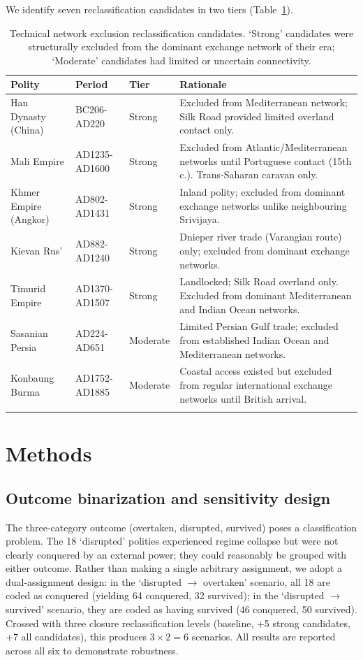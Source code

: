 \documentclass[pdflatex,sn-basic]{sn-jnl}
\theoremstyle{thmstyleone}%
\theoremstyle{thmstyletwo}%
\theoremstyle{thmstylethree}%
\begin{document}
We identify seven reclassification candidates in two tiers (Table~\ref{tab:reclass}).

\begin{table}[htbp]
\caption{Technical network exclusion reclassification candidates. `Strong' candidates were structurally excluded from the dominant exchange network of their era; `Moderate' candidates had limited or uncertain connectivity.}
\label{tab:reclass}
\begin{tabular*}{\textwidth}{@{\extracolsep\fill}lllp{7cm}}
\toprule
Polity & Period & Tier & Rationale \\
\midrule
Han Dynasty (China) & BC206-AD220 & Strong & Excluded from Mediterranean network; Silk Road provided limited overland contact only. \\
Mali Empire & AD1235-AD1600 & Strong & Excluded from Atlantic/Mediterranean networks until Portuguese contact (15th c.). Trans-Saharan caravan only. \\
Khmer Empire (Angkor) & AD802-AD1431 & Strong & Inland polity; excluded from dominant exchange networks unlike neighbouring Srivijaya. \\
Kievan Rus' & AD882-AD1240 & Strong & Dnieper river trade (Varangian route) only; excluded from dominant exchange networks. \\
Timurid Empire & AD1370-AD1507 & Strong & Landlocked; Silk Road overland only. Excluded from dominant Mediterranean and Indian Ocean networks. \\
Sasanian Persia & AD224-AD651 & Moderate & Limited Persian Gulf trade; excluded from established Indian Ocean and Mediterranean networks. \\
Konbaung Burma & AD1752-AD1885 & Moderate & Coastal access existed but excluded from regular international exchange networks until British arrival. \\
\botrule
\end{tabular*}
\end{table}

\section{Methods}\label{sec:methods}

\subsection{Outcome binarization and sensitivity design}\label{sec:methods-binarization}

The three-category outcome (overtaken, disrupted, survived) poses a classification problem. The 18 `disrupted' polities experienced regime collapse but were not clearly conquered by an external power; they could reasonably be grouped with either outcome. Rather than making a single arbitrary assignment, we adopt a dual-assignment design: in the `disrupted $\to$ overtaken' scenario, all 18 are coded as conquered (yielding 64 conquered, 32 survived); in the `disrupted $\to$ survived' scenario, they are coded as having survived (46 conquered, 50 survived). Crossed with three closure reclassification levels (baseline, +5 strong candidates, +7 all candidates), this produces $3 \times 2 = 6$ scenarios. All results are reported across all six to demonstrate robustness.
\end{document}
